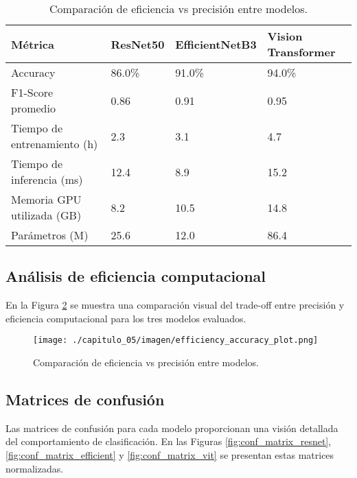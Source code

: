 \begin{table}[H]
\begin{table}[H]
\centering
\renewcommand{\arraystretch}{1.3}
\caption{Comparación de métricas entre modelos}
\label{tab:comparative_metrics}
\begin{tabular}{|p{3.5cm}|p{2.3cm}|p{2.8cm}|p{2.8cm}|}
\hline
\textbf{Métrica} & \textbf{ResNet50} & \textbf{EfficientNetB3} & \textbf{Vision Transformer} \\ \hline
Accuracy & 86.0\% & 91.0\% & 94.0\% \\ \hline
F1-Score promedio & 0.86 & 0.91 & 0.95 \\ \hline
Tiempo de entrenamiento (h) & 2.3 & 3.1 & 4.7 \\ \hline
Tiempo de inferencia (ms) & 12.4 & 8.9 & 15.2 \\ \hline
Memoria GPU utilizada (GB) & 8.2 & 10.5 & 14.8 \\ \hline
Parámetros (M) & 25.6 & 12.0 & 86.4 \\ \hline
\end{tabular}
\end{table}

\subsection{Análisis de eficiencia computacional}

En la Figura \ref{fig:efficiency_comparison} se muestra una comparación visual del trade-off entre precisión y eficiencia computacional para los tres modelos evaluados.

\begin{figure}[H]
\leavevmode
\begin{minipage}{\textwidth}
\begin{center}
\texttt{[image: ./capitulo\_05/imagen/efficiency\_accuracy\_plot.png]}
\caption{Comparación de eficiencia vs precisión entre modelos.\label{fig:efficiency_comparison}}
\end{center}
\end{minipage}
\end{figure}

\subsection{Matrices de confusión}

Las matrices de confusión para cada modelo proporcionan una visión detallada del comportamiento de clasificación. En las Figuras \ref{fig:conf_matrix_resnet}, \ref{fig:conf_matrix_efficient} y \ref{fig:conf_matrix_vit} se presentan estas matrices normalizadas.


\end{table}

